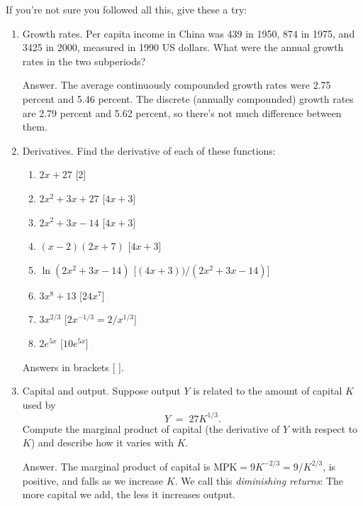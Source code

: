 If you're not sure you followed all this, give these a try:
%
\begin{enumerate}

\item Growth rates.
Per capita income in China was 439 in 1950, 874 in 1975, and 3425 in 2000,
measured in 1990 US dollars.
What were the annual growth rates in the two subperiods?

Answer.
The average continuously compounded
growth rates were 2.75 percent and
5.46 percent.
The discrete (annually compounded) growth rates are
2.79 percent and 5.62 percent, so there's not much difference between them.



\item Derivatives. Find the derivative of each of these functions:
%
\begin{enumerate}
\item $2x + 27$  [2]
\item $2x^2 + 3x  +27$  [$4x+3$]
\item $2x^2 + 3x - 14$  [$4x+3$]
\item $(x-2)(2x+7)$  [$4x+3$]
\item $\ln(2x^2 + 3x - 14)$  [$(4x+3))/(2x^2+3x-14)$]
\item $3x^8 + 13$  [$24x^7$]
\item $3x^{2/3}$ [$2 x^{-1/3} = 2 / x^{1/3}$]
\item $2 e^{5x}$ [$10 e^{5x}$]
\end{enumerate}

Answers in brackets [ ].

\item Capital and output.  Suppose output $Y$ is related to the amount of capital $K$ used by
\[
    Y \;=\; 27 K^{1/3} .
\]
Compute the marginal product of capital (the derivative of $Y$ with respect to $K$)
and describe how it varies with $K$. 

Answer.  The marginal product of capital is $ \mbox{MPK} = 9 K^{-2/3} = 9
/ K^{2/3} $, is positive, and falls as we increase $K$. We call this
\emph{diminishing returns}:  The more capital we add, the less it
increases output.


\end{enumerate}
